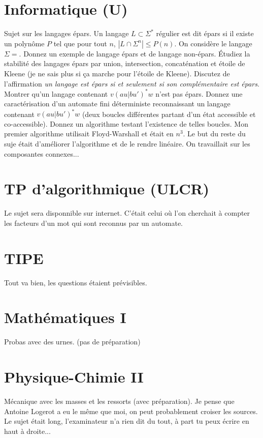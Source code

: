 \documentclass[french,a4paper, 12pt]{article}
\begin{document}
\section*{Informatique (U)}

Sujet sur les langages épars. Un langage $L\subset\Sigma^*$ régulier est dit épars si il existe un polynôme $P$ tel que pour tout $n$, $|L \cap \Sigma^n| \le P(n)$. On considère le langage $\Sigma = {}$. Donnez un exemple de langage épars et de langage non-épars. Étudiez la stabilité des langages épars par union, intersection, concaténation et étoile de Kleene (je ne sais plus si ça marche  pour l'étoile de Kleene). Discutez de l'affirmation \emph{un langage est épars si et seulement si son complémentaire est épars}. Montrer qu'un langage contenant $v(au|bu')^*w$ n'est pas épars. Donnez une caractérisation d'un automate fini déterministe reconnaissant un langage contenant $v(au|bu')^*w$ (deux boucles différentes partant d'un état accessible et co-accessible). Donnez un algorithme testant l'existence de telles boucles. Mon premier algorithme utilisait Floyd-Warshall et était en $n^3$. Le but du reste du suje était d'améliorer l'algorithme et de le rendre linéaire. On travaillait sur les composantes connexes...

\section*{TP d'algorithmique (ULCR)}

Le sujet sera disponnible sur internet. C'était celui où l'on cherchait à compter les facteurs d'un mot qui sont reconnus par un automate.

\section*{}

\section*{TIPE}
Tout va bien, les questions étaient prévisibles.
\section*{Mathématiques I}
Probas avec des urnes. (pas de préparation)
\section*{Physique-Chimie II}
Mécanique avec les masses et les ressorts (avec préparation). Je pense que Antoine Logerot a eu le même que moi, on peut probablement croiser les sources. Le sujet était long, l'examinateur n'a rien dit du tout, à part tu peux écrire en haut à droite...
\end{document}
